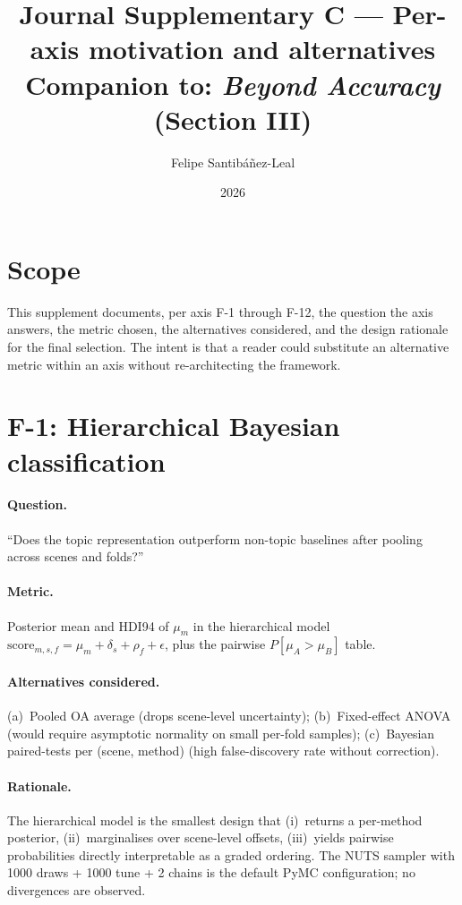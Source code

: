 \documentclass[11pt,a4paper]{article}
\title{Journal Supplementary C --- Per-axis motivation and alternatives\\
{\large Companion to: \emph{Beyond Accuracy} (Section III)}}
\author{Felipe Santib\'a\~nez-Leal}
\date{2026}
\begin{document}
\maketitle

\section{Scope}
This supplement documents, per axis F-1 through F-12, the question
the axis answers, the metric chosen, the alternatives considered,
and the design rationale for the final selection. The intent is
that a reader could substitute an alternative metric within an axis
without re-architecting the framework.

\section{F-1: Hierarchical Bayesian classification}

\paragraph{Question.} ``Does the topic representation outperform
non-topic baselines after pooling across scenes and folds?''

\paragraph{Metric.} Posterior mean and HDI94 of $\mu_m$ in the
hierarchical model $\text{score}_{m,s,f} = \mu_m + \delta_s + \rho_f
+ \epsilon$, plus the pairwise $P[\mu_A > \mu_B]$ table.

\paragraph{Alternatives considered.} (a)~Pooled OA average (drops
scene-level uncertainty); (b)~Fixed-effect ANOVA (would require
asymptotic normality on small per-fold samples); (c)~Bayesian
paired-tests per (scene, method) (high false-discovery rate without
correction).

\paragraph{Rationale.} The hierarchical model is the smallest design
that (i)~returns a per-method posterior, (ii)~marginalises over
scene-level offsets, (iii)~yields pairwise probabilities directly
interpretable as a graded ordering. The NUTS sampler with 1000
draws + 1000 tune + 2 chains is the default PyMC configuration; no
divergences are observed.
\end{document}
